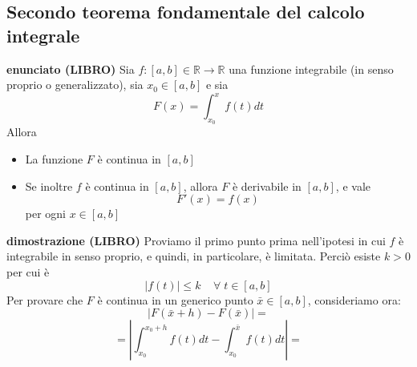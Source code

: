 \documentclass[a4paper, 9pt]{report}
\begin{document}
\newpage
\subsection*{Secondo teorema fondamentale del calcolo integrale}
\textbf{enunciato (LIBRO)}
Sia $f : [a,b] \in \mathbb{R} \rightarrow \mathbb{R}$ una funzione integrabile (in senso proprio o generalizzato), sia $x_0 \in [a,b]$ e sia
\[
    F(x) = \int_{x_0}^{x} f(t) dt
\]
Allora
\begin{itemize}
    \item La funzione $F$ è continua in $[a,b]$
    \item Se inoltre $f$ è continua in $[a,b]$, allora $F$ è derivabile in $[a,b]$, e vale \[
        F'(x) = f(x)
    \]
    per ogni $x \in [a,b]$
\end{itemize}
\textbf{dimostrazione (LIBRO)}\newline
Proviamo il primo punto prima nell'ipotesi in cui $f$ è integrabile in senso proprio, e quindi, in particolare, è limitata. Perciò esiste $k>0$ per cui è
\[
    |f(t)| \leq k \;\;\;\;\forall\;t \in[a,b]
\]
Per provare che $F$ è continua in un generico punto $\bar{x} \in[a,b]$, consideriamo ora:
\[
    |F(\bar{x}+h) - F(\bar{x})| =
\]
\[
    = \left|\int_{x_0}^{x_0+h}f(t)dt - \int_{x_0}^{\bar{x}}f(t)dt\right| =
\]
\end{document}
